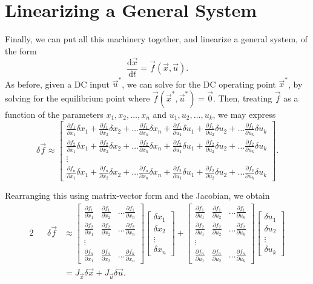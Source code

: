 \documentclass[letterpaper]{article}
\theoremstyle{remark}
\newcommand{\dt}{\mathrm{d}t}
\newcommand{\diff}{\mathrm{d}}
\newcommand{\mat}[1]{\ensuremath{\begin{bmatrix}#1\end{bmatrix}}}
\newcommand{\eqn}[1]{\begin{alignat*}{2}#1\end{alignat*}}
\newcommand{\p}[2]{\frac{\partial #1}{\partial #2}}
\begin{document}
\section{Linearizing a General System}
Finally, we can put all this machinery together, and linearize a general system, of the form
\[
    \frac{\diff \vec{x}}{\dt} = \vec{f}(\vec{x}, \vec{u}).
\]
As before, given a DC input $\vec{u}^*$, we can solve for the DC operating point $\vec{x}^*$, by solving for the equilibrium point where $\vec{f}(\vec{x}^*, \vec{u}^*) = \vec{0}$. Then, treating $\vec{f}$ as a function of the parameters $x_1, x_2, \ldots, x_n$ and $u_1, u_2, \ldots, u_k$, we may express
\[
    \delta \vec{f} \approx \mat{
    \p{f_1}{x_1} \delta x_1 + \p{f_1}{x_2} \delta x_2 + \ldots \p{f_1}{x_n} \delta x_n + 
    \p{f_1}{u_1} \delta u_1 + \p{f_1}{u_2} \delta u_2 + \ldots \p{f_1}{u_k} \delta u_k \\
    \p{f_2}{x_1} \delta x_1 + \p{f_2}{x_2} \delta x_2 + \ldots \p{f_2}{x_n} \delta x_n + 
    \p{f_2}{u_1} \delta u_1 + \p{f_2}{u_2} \delta u_2 + \ldots \p{f_2}{u_k} \delta u_k \\
    \vdots \\
    \p{f_n}{x_1} \delta x_1 + \p{f_n}{x_2} \delta x_2 + \ldots \p{f_n}{x_n} \delta x_n + 
    \p{f_2}{u_1} \delta u_1 + \p{f_2}{u_2} \delta u_2 + \ldots \p{f_2}{u_k} \delta u_k}. 
\]

Rearranging this using matrix-vector form and the Jacobian, we obtain
\eqn{
    && \delta \vec{f} &\approx \mat{
    \p{f_1}{x_1} & \p{f_1}{x_2} & \ldots \p{f_1}{x_n} \\
    \p{f_2}{x_1} & \p{f_2}{x_2} & \ldots \p{f_2}{x_n} \\
    \vdots \\
    \p{f_n}{x_1} & \p{f_n}{x_2} & \ldots \p{f_n}{x_n}} \mat{\delta x_1 \\ \delta x_2 \\ \vdots \\ \delta x_n} + \mat{
    \p{f_1}{u_1} & \p{f_1}{u_2} & \ldots \p{f_1}{u_k} \\
    \p{f_2}{u_1} & \p{f_2}{u_2} & \ldots \p{f_2}{u_k} \\
    \vdots \\
    \p{f_n}{u_1} & \p{f_n}{u_2} & \ldots \p{f_n}{u_k}} \mat{\delta u_1 \\ \delta u_2 \\ \vdots \\ \delta u_k} \\
    &&&= J_{\vec{x}} \delta \vec{x} + J_{\vec{u}} \delta \vec{u}.
}
\end{document}
